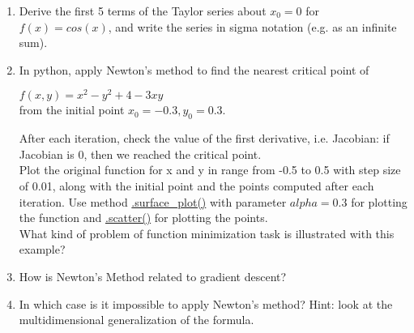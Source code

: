 \begin{exercise}

    \begin{enumerate}
    \item Derive the first 5 terms of the Taylor series about $x_0 = 0$ for $f(x) = cos(x)$, and write the series in sigma notation (e.g. as an infinite sum).
    
    \item In python, apply Newton's method to find the nearest critical point of \\
    \begin{center} $f(x, y) = x^2 - y^2 + 4 - 3xy$\\
    from the initial point $x_0 = -0.3, y_0 = 0.3$.\\ \end{center}
    After each iteration, check the value of the first derivative, i.e. Jacobian: if Jacobian is 0, then we reached the critical point.\\
    Plot the original function for x and y in range from -0.5 to 0.5 with step size of 0.01, along with the initial point and the points computed after each iteration.
    Use method \href{https://matplotlib.org/3.1.0/gallery/mplot3d/surface3d.html}{.surface\_plot()} with parameter $alpha=0.3$ for plotting the function and \href{https://matplotlib.org/mpl_toolkits/mplot3d/tutorial.html}{.scatter()} for plotting the points. \\
	What kind of problem of function minimization task is illustrated with this example?
    
    \item How is Newton’s Method related to gradient descent?
    
	\item In which case is it impossible to apply Newton's method? Hint: look at the multidimensional generalization of the formula.
	
	
    
  \end{enumerate}
    
\end{exercise}


\begin{solution}
\end{solution}


